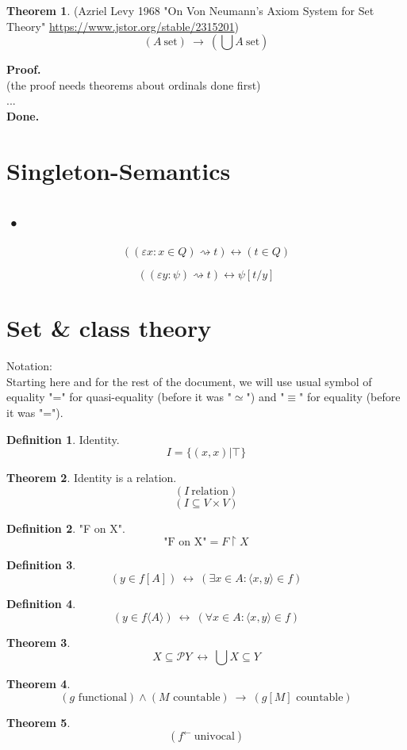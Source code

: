 \documentclass[10pt,a4paper]{article}
\theoremstyle{definition}
\newtheorem{definition}{Definition}[section]
\newtheorem{theorem}{Theorem}[section]
\newcommand{\countable}{\mbox{\ countable}}
\newcommand{\Done}{\noindent \textbf{Done.}\\}
\newcommand{\functional}{\mbox{\ functional}}
\renewcommand{\iff}{\ \longleftrightarrow\ }
\renewcommand{\implies}{\ \longrightarrow\ }
\newcommand{\intersection}{\bigcap}
\newcommand{\power}{\mathcal{P}}
\newcommand{\Proof}{\noindent \textbf{Proof.}\\}
\newcommand{\relation}{\mathrm{\ relation}}
\newcommand{\set}{\mathrm{\ set}}
\newcommand{\union}{\bigcup}
\newcommand{\univocal}{\mathrm{\ univocal}}
\begin{document}
\begin{theorem}
(Azriel Levy 1968 "On Von Neumann's Axiom System for Set Theory"
\url{https://www.jstor.org/stable/2315201})
\[
(A\set)
\implies
\left(\union A\set\right)
\]
\end{theorem}
\Proof
(the proof needs theorems about ordinals done first)\\
...\\
\Done



\iffalse
\section{Singleton-Semantics}
\subsection{•}
\[((\varepsilon x:x\in Q)\rightsquigarrow t) \longleftrightarrow (t\in Q)\]

\[((\varepsilon y:\psi)\rightsquigarrow t) \longleftrightarrow \psi[t/y]\]
\section{Set \& class theory}
Notation:\\

Starting here and for the rest of the document, we will use usual symbol of equality "=" for quasi-equality (before it was "$\simeq$") and "$\equiv$" for equality (before it was "=").

\begin{definition}
\label{def:identity}
Identity.
\[
I = \{(x,x)|\top\}
\]
\end{definition}

\begin{theorem}
\label{thm:identity is relation}
Identity is a relation.
\[
(I \relation)
\]
\[(I\subseteq V\times V)\]
\end{theorem}


\begin{definition}
"F on X".
\[
\mbox{"F on X"} = F\restriction X
\]
\end{definition}


\begin{definition}
\[
(y\in f[A])
\iff
(\exists x\in A: \langle x,y\rangle\in f)
\]
\end{definition}

\begin{definition}
\[
(y\in f\langle A\rangle)
\iff
(\forall x\in A: \langle x,y\rangle\in f)
\]
\end{definition}
\begin{theorem}
\[
X\subseteq \power Y
\iff
\union X \subseteq Y
\]
\end{theorem}
\begin{theorem}
\[
(g\functional)
\land
(M \countable)
\implies
(g[M] \countable)
\]
\end{theorem}
\begin{theorem}
\[
(f^\leftarrow \univocal)
\]
\end{theorem}
\end{document}
